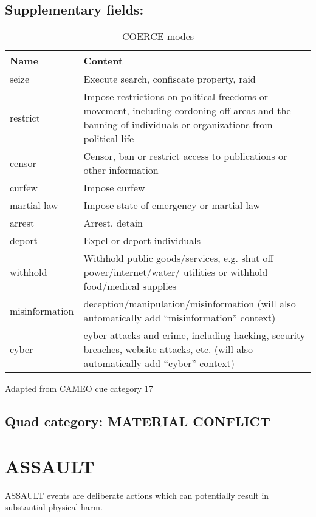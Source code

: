 \documentclass[11pt]{report}
\newcommand{\plcat}[1]{\textsf{#1}}
\begin{document}
\subsection{Supplementary fields: }

\begin{table}[htp]
\caption{COERCE modes}
\begin{center}
\begin{tabular}{|p{}|L{.73\textwidth}|}
\hline
Name & Content \\
\hline
seize & Execute search, confiscate property, raid \\
restrict & Impose restrictions on political freedoms or movement, including cordoning off areas and the banning of individuals or organizations from political life \\
censor & Censor, ban or restrict access to publications or other information  \\
curfew & Impose curfew \\
martial-law & Impose state of emergency or martial law \\
arrest & Arrest, detain  \\
deport & Expel or deport individuals \\
withhold & Withhold public goods/services, e.g. shut off power/internet/water/ utilities or withhold food/medical supplies \\
misinformation & deception/manipulation/misinformation (will also automatically add ``misinformation'' context) \\
cyber & cyber attacks and crime, including hacking, security breaches, website attacks, etc. (will also automatically add ``cyber'' context) \\
\hline
\end{tabular}
\end{center}
\label{tab:coerce}
Adapted from CAMEO cue category 17
\end{table}%


\subsection{Quad category: MATERIAL CONFLICT}

\newpage


\section{ASSAULT}

\plcat{ASSAULT} events are deliberate actions which can potentially result in substantial physical harm.
\end{document}

